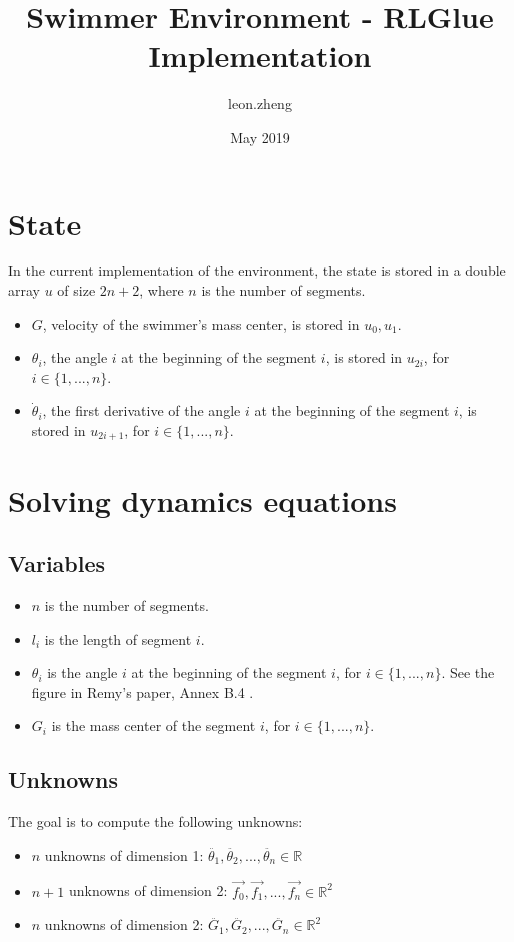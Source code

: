 \documentclass{article}
\title{Swimmer Environment - RLGlue Implementation}
\author{leon.zheng }
\date{May 2019}
\begin{document}
\maketitle

\section{State}

In the current implementation of the environment, the state is stored in a double array $u$ of size $2n+2$, where $n$ is the number of segments.
\begin{itemize}
    \item $G$, velocity of the swimmer's mass center, is stored in $u_0, u_1$.
    \item $\theta_i$, the angle $i$ at the beginning of the segment $i$, is stored in $u_{2i}$, for $i \in \{1, ..., n\}$.
    \item $\dot{\theta}_i$, the first derivative of the angle $i$ at the beginning of the segment $i$, is stored in $u_{2i+1}$, for $i \in \{1, ..., n\}$.
\end{itemize}

\section{Solving dynamics equations}

\subsection{Variables}
\begin{itemize}
    \item $n$ is the number of segments.
    \item $l_i$ is the length of segment $i$.
    \item $\theta_i$ is the angle $i$ at the beginning of the segment $i$, for $i \in \{1, ..., n\}$. See the figure in Remy's paper, Annex B.4 \cite{Coulom-2002a}.
    \item $G_i$ is the mass center of the segment $i$, for $i \in \{1, ..., n\}$.
\end{itemize}

\subsection{Unknowns}
The goal is to compute the following unknowns:
\begin{itemize}
  \item $n$ unknowns of dimension 1: $\ddot{\theta_1}, \ddot{\theta_2}, ... , \ddot{\theta_n} \in \mathbb{R}$
  \item $n+1$ unknowns of dimension 2: $\vec{f_0}, \vec{f_1}, ..., \vec{f_n} \in \mathbb{R}^2$
  \item $n$ unknowns of dimension 2: $\ddot{G_1}, \ddot{G_2}, ..., \ddot{G_n} \in \mathbb{R}^2$
\end{itemize}
\end{document}
